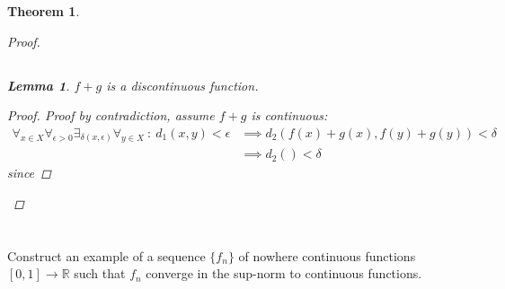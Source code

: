 \documentclass[]{article}
\newcommand{\R}{\mathbb{R}}
\newcommand{\st}{\ : \ }
\newtheorem{theorem}{Theorem}
\newtheorem{lemma}{Lemma}
\begin{document}
\begin{theorem}
\begin{proof}
        \subsection{}
        \begin{lemma}
            $f + g$ is a discontinuous function.
            \begin{proof}
                Proof by contradiction, assume $f + g$ is continuous:
                \begin{align*}
                    \forall_{x \in X} \forall_{\epsilon > 0} \exists_{\delta(x, \epsilon)} \forall_{y \in X} \st d_1(x,y) < \epsilon
                        &\implies d_2(f(x) + g(x), f(y) + g(y)) < \delta\\
                        &\implies d_2() < \delta
                \end{align*}
                since 
            \end{proof}
        \end{lemma}
    \end{proof}
\end{theorem}




\newpage
\section{}
Construct an example of a sequence $\{f_n\}$ of nowhere continuous functions $[0,1] \to \R$ such that $f_n$ converge in the sup-norm to continuous functions.
\end{document}
